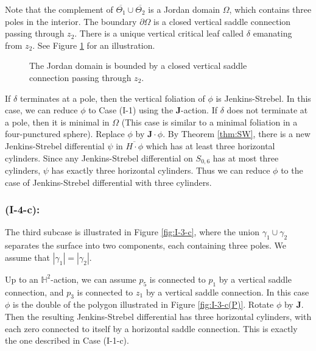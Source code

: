 \documentclass[11pt]{amsart}
\theoremstyle{plain}
\newcommand{\HP}{\mathbb{H}}
\newcommand{\rot}{\mathbf{J}}
\begin{document}
Note that the complement of $\overline{\Theta_1}\cup\overline{\Theta_2}$ is a Jordan domain
$\Omega$, which contains three poles in the interior. The boundary $\partial\Omega$
is a closed vertical saddle connection passing through $z_2$. There is a unique vertical critical leaf called $\delta$ emanating from $z_2$.  See Figure \ref{fig:I-4-0} for an illustration.

\begin{figure}
    \centering
   \caption{The Jordan domain is bounded by a closed vertical saddle connection passing through $z_2$.}
   \label{fig:I-4-0}
\end{figure}

 If $\delta$ terminates at a pole, then the vertical foliation of $\phi$ is Jenkins-Strebel. In this case,  we can reduce $\phi$ to Case (I-1) using the  $\rot$-action. If $\delta$ does not terminate at a pole, then it is minimal in $\Omega$ (This case is similar to a minimal foliation in a four-punctured sphere). Replace $\phi$ by $\rot \cdot \phi$.
 By Theorem \ref{thm:SW},   there
is a new Jenkins-Strebel differential $\psi$ in $\overline{H\cdot \phi}$ which has at least three horizontal cylinders. Since any Jenkins-Strebel differential on $S_{0,6}$ has at most three cylinders, $\psi$ has exactly three horizontal cylinders. Thus we can reduce $\phi$ to the case of Jenkins-Strebel differential with three cylinders.





\subsubsection*{\textbf{(I-4-c):}} 
The third subcase is illustrated in Figure \ref{fig:I-3-c}, where
the union $\gamma_1\cup\gamma_2$
separates the surface into two components, each containing three poles. We assume that $|\gamma_1|=|\gamma_2|$. 

Up to an $\HP^2$-action, we can assume $p_5$
is connected to $p_1$ by a vertical saddle connection, and 
 $p_3$
is connected to  $z_1$ by a vertical saddle connection.
In this case $\phi$ is the double of the polygon 
 illustrated in Figure \ref{fig:I-3-c(P)}.
Rotate  $\phi$ by $\rot$. 
Then the resulting Jenkins-Strebel differential has three horizontal cylinders, with each zero connected to itself by a horizontal saddle connection. This is exactly the one described in Case (I-1-c). 
\end{document}
